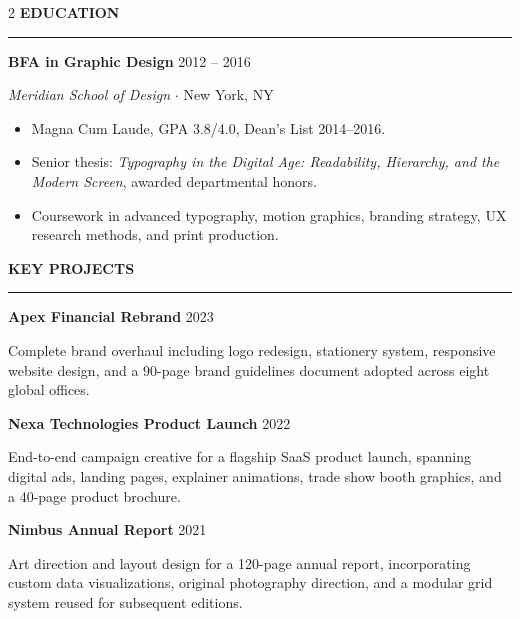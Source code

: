 \documentclass[10pt,a4paper]{article}
\newcommand{\rsection}[1]{%
  \vspace{16pt}
  {\Large\bfseries\color{primary}\MakeUppercase{#1}}\par
  \vspace{3pt}
  {\color{accent}\rule{\linewidth}{1.5pt}}\par  %
  \vspace{10pt}
}
\begin{document}
\begin{paracol}{2}
    \rsection{Education}
    {\large\bfseries\color{primary} BFA in Graphic Design}
    \hfill
    {\small\color{graytext} 2012 -- 2016}\par
    {\itshape Meridian School of Design}
    {\color{accent}$\cdot$}
    New York, NY\par
    \vspace{4pt}
    \begin{itemize}
      \item Magna Cum Laude, GPA 3.8/4.0, Dean's List 2014--2016.
      \item Senior thesis: \textit{Typography in the Digital Age: Readability,
            Hierarchy, and the Modern Screen}, awarded departmental honors.
      \item Coursework in advanced typography, motion graphics, branding
            strategy, UX research methods, and print production.
    \end{itemize}

    \rsection{Key Projects}
    {\bfseries\color{primary} Apex Financial Rebrand}
    \hfill
    {\small\color{graytext} 2023}\par
    Complete brand overhaul including logo redesign, stationery system,
    responsive website design, and a 90-page brand guidelines document
    adopted across eight global offices.\par
    \vspace{8pt}

    {\bfseries\color{primary} Nexa Technologies Product Launch}
    \hfill
    {\small\color{graytext} 2022}\par
    End-to-end campaign creative for a flagship SaaS product launch,
    spanning digital ads, landing pages, explainer animations, trade
    show booth graphics, and a 40-page product brochure.\par
    \vspace{8pt}

    {\bfseries\color{primary} Nimbus Annual Report}
    \hfill
    {\small\color{graytext} 2021}\par
    Art direction and layout design for a 120-page annual report,
    incorporating custom data visualizations, original photography
    direction, and a modular grid system reused for subsequent editions.
\end{paracol}
\end{document}
